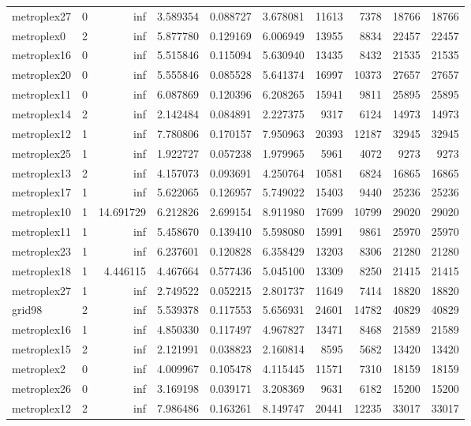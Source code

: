 \begin{longtable}{|l|r|r|r|r|r|r|r|r|r|}
metroplex27 & 0 & inf & 3.589354 & 0.088727 & 3.678081 & 11613 & 7378 & 18766 & 18766 \\
metroplex0 & 2 & inf & 5.877780 & 0.129169 & 6.006949 & 13955 & 8834 & 22457 & 22457 \\
metroplex16 & 0 & inf & 5.515846 & 0.115094 & 5.630940 & 13435 & 8432 & 21535 & 21535 \\
metroplex20 & 0 & inf & 5.555846 & 0.085528 & 5.641374 & 16997 & 10373 & 27657 & 27657 \\
metroplex11 & 0 & inf & 6.087869 & 0.120396 & 6.208265 & 15941 & 9811 & 25895 & 25895 \\
metroplex14 & 2 & inf & 2.142484 & 0.084891 & 2.227375 & 9317 & 6124 & 14973 & 14973 \\
metroplex12 & 1 & inf & 7.780806 & 0.170157 & 7.950963 & 20393 & 12187 & 32945 & 32945 \\
metroplex25 & 1 & inf & 1.922727 & 0.057238 & 1.979965 & 5961 & 4072 & 9273 & 9273 \\
metroplex13 & 2 & inf & 4.157073 & 0.093691 & 4.250764 & 10581 & 6824 & 16865 & 16865 \\
metroplex17 & 1 & inf & 5.622065 & 0.126957 & 5.749022 & 15403 & 9440 & 25236 & 25236 \\
metroplex10 & 1 & 14.691729 & 6.212826 & 2.699154 & 8.911980 & 17699 & 10799 & 29020 & 29020 \\
metroplex11 & 1 & inf & 5.458670 & 0.139410 & 5.598080 & 15991 & 9861 & 25970 & 25970 \\
metroplex23 & 1 & inf & 6.237601 & 0.120828 & 6.358429 & 13203 & 8306 & 21280 & 21280 \\
metroplex18 & 1 & 4.446115 & 4.467664 & 0.577436 & 5.045100 & 13309 & 8250 & 21415 & 21415 \\
metroplex27 & 1 & inf & 2.749522 & 0.052215 & 2.801737 & 11649 & 7414 & 18820 & 18820 \\
grid98 & 2 & inf & 5.539378 & 0.117553 & 5.656931 & 24601 & 14782 & 40829 & 40829 \\
metroplex16 & 1 & inf & 4.850330 & 0.117497 & 4.967827 & 13471 & 8468 & 21589 & 21589 \\
metroplex15 & 2 & inf & 2.121991 & 0.038823 & 2.160814 & 8595 & 5682 & 13420 & 13420 \\
metroplex2 & 0 & inf & 4.009967 & 0.105478 & 4.115445 & 11571 & 7310 & 18159 & 18159 \\
metroplex26 & 0 & inf & 3.169198 & 0.039171 & 3.208369 & 9631 & 6182 & 15200 & 15200 \\
metroplex12 & 2 & inf & 7.986486 & 0.163261 & 8.149747 & 20441 & 12235 & 33017 & 33017 \\

\end{longtable}
